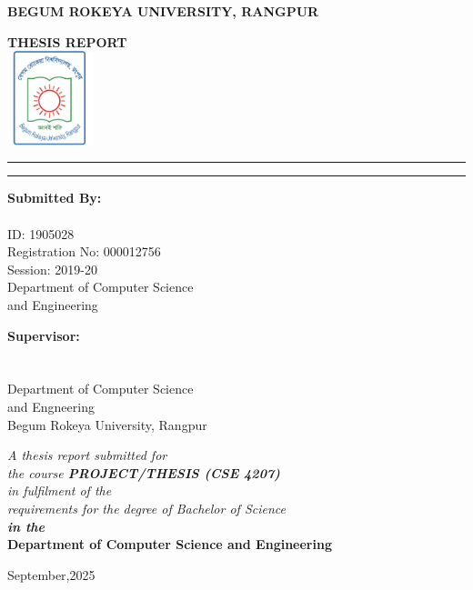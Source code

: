 \begin{titlepage}
\begin{center}
{\Large \textbf{BEGUM ROKEYA UNIVERSITY, RANGPUR}}

\vspace{1cm}
{ \textbf{THESIS REPORT}}\\
\vspace{0.5cm}
\includegraphics[width=2.5cm]{sections/logo.jpg}\\

\vspace{0.5cm}
\rule{\textwidth}{0.4pt}

\vspace{0.3cm}
{\Large \textbf{\projectTitle}}
\vspace{0.3cm}

\rule{\textwidth}{0.4pt}

\vspace{1.5cm}
\begin{minipage}[t]{0.45\textwidth}
\textbf{Submitted By:}\\
\theauthor\\
ID: 1905028\\
Registration No: 000012756\\
Session: 2019-20\\
Department of Computer Science \\and Engineering
\end{minipage}
\hfill
\begin{minipage}[t]{0.45\textwidth}
\textbf{Supervisor:}\\
\thesupervisor\\
\thesupervisortitle\\
Department of Computer Science\\ and Engneering\\
Begum Rokeya University, Rangpur
\end{minipage}

\vspace{1.5cm}
\textit{A thesis report submitted for\\
the course \textbf{PROJECT/THESIS (CSE 4207)}\\
in fulfilment of the\\
requirements for the degree of Bachelor of Science\\
\textbf{in the}}\\
\large \textbf{Department of Computer Science and Engineering}

\vspace{0.5cm}
\small September,2025
\end{center}
\end{titlepage}
